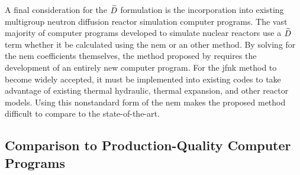     A final consideration for the $\widetilde{D}$ formulation is the incorporation
    into existing multigroup neutron diffusion reactor simulation computer
    programs. The vast majority of computer programs developed to simulate
    nuclear reactors use a $\widetilde{D}$ term whether it be calculated using the
    \gls{nem} or an other method. By solving for the \gls{nem} coefficients
    themselves, the method proposed by \citeauthor{qe2paper} requires the
    development of an entirely new computer program. For the \gls{jfnk} method
    to become widely accepted, it must be implemented into existing codes to
    take advantage of existing thermal hydraulic, thermal expansion, and other
    reactor models. Using this nonstandard form of the \gls{nem} makes the
    proposed method difficult to compare to the state-of-the-art.

  \subsection{Comparison to Production-Quality Computer Programs}

